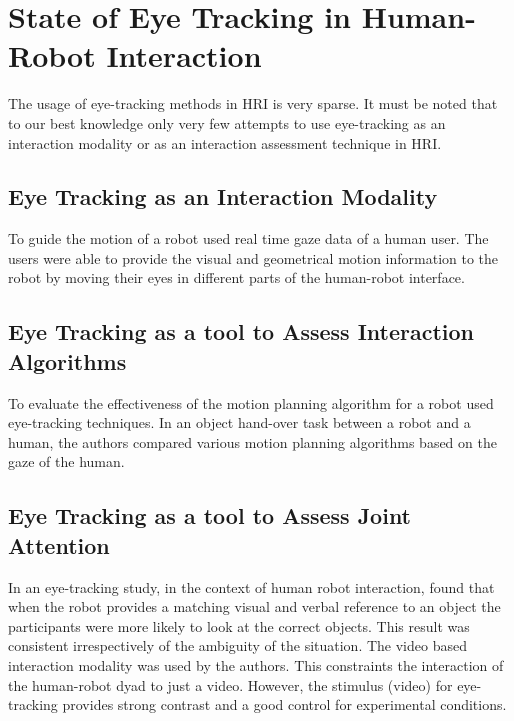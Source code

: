 \documentclass{sig-alternate}
\begin{document}


\section{State of Eye Tracking in Human-Robot Interaction}

The usage of eye-tracking methods in HRI is very sparse. It must be noted that to our best knowledge only very few attempts to use eye-tracking as an interaction modality or as an interaction assessment technique in HRI.

\subsection{Eye Tracking as an Interaction Modality}

To guide the motion of a robot \cite{bhuiyan2004tracking} used real time  gaze data of a human user. The users were able to provide the visual and geometrical motion information to the robot by moving their eyes in different parts of the human-robot interface.

\subsection{Eye Tracking as a tool to Assess Interaction Algorithms}

To evaluate the effectiveness of the motion planning algorithm for a robot \cite{dehais2011physiological} used eye-tracking techniques. In an object hand-over task between a robot and a human, the authors compared various motion planning algorithms based on the gaze of the human.

\subsection{Eye Tracking as a tool to Assess Joint Attention}

 In an eye-tracking study, in the context of human robot interaction, \cite{staudte2009visual} found
that when the robot provides a matching visual and verbal reference to an object
the participants were more likely to look at the correct objects. This result
was consistent irrespectively of the ambiguity of the situation. The video based interaction modality was used by the authors. This constraints the  interaction of the human-robot dyad to just a video. However, the stimulus (video) for eye-tracking provides strong contrast and a good control for experimental conditions.
\end{document}
